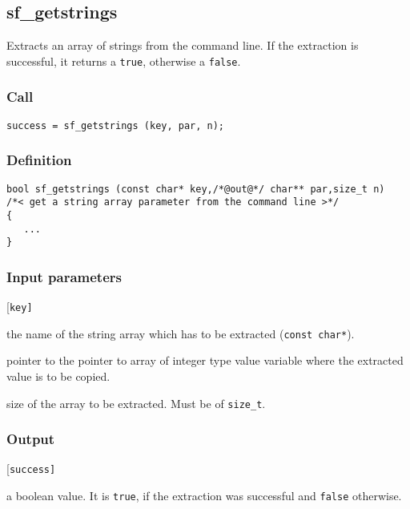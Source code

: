 \subsection{{sf\_getstrings}}
Extracts an array of strings from the command line. If the extraction is successful, it returns a \texttt{true}, otherwise a \texttt{false}. 

\subsubsection*{Call}
\begin{verbatim}success = sf_getstrings (key, par, n);\end{verbatim}

\subsubsection*{Definition}
\begin{verbatim}
bool sf_getstrings (const char* key,/*@out@*/ char** par,size_t n) 
/*< get a string array parameter from the command line >*/
{
   ...
}
\end{verbatim}

\subsubsection*{Input parameters}
\begin{desclist}{\tt }{\quad}[\tt key]
   \setlength\itemsep{0pt}
   \item[key] the name of the string array which has to be extracted (\texttt{const char*}).
   \item[par] pointer to the pointer to array of integer type value variable where the extracted value is to be copied. 
   \item[n] size of the array to be extracted. Must be of \texttt{size\_t}.
\end{desclist}

\subsubsection*{Output}
\begin{desclist}{\tt }{\quad}[\tt success]
   \setlength\itemsep{0pt}
   \item[success]  a boolean value. It is \texttt{true}, if the extraction was successful and \texttt{false} otherwise.
\end{desclist}





